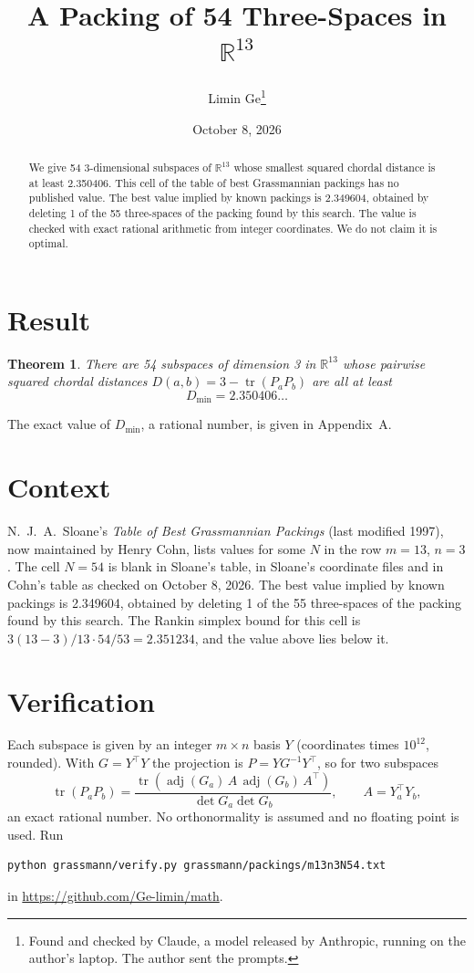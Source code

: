 \documentclass[11pt,a4paper]{article}
\title{A Packing of 54 Three-Spaces in $\mathbb{R}^{13}$}
\author{Limin Ge\thanks{Found and checked by Claude, a model released by Anthropic, running on the author's laptop. The author sent the prompts.}}
\date{October 8, 2026}
\newtheorem*{theorem}{Theorem}
\begin{document}
\maketitle
\begin{abstract}
We give 54 3-dimensional subspaces of $\mathbb{R}^{13}$ whose smallest squared chordal distance is at least 2.350406. This cell of the table of best Grassmannian packings has no published value. The best value implied by known packings is 2.349604, obtained by deleting 1 of the 55 three-spaces of the packing found by this search. The value is checked with exact rational arithmetic from integer coordinates. We do not claim it is optimal.
\end{abstract}

\section{Result}
\begin{theorem}
There are 54 subspaces of dimension 3 in $\mathbb{R}^{13}$ whose pairwise squared chordal distances $D(a,b) = 3 - \operatorname{tr}(P_aP_b)$ are all at least
\[ D_{\min} = 2.350406\ldots \]
\end{theorem}
The exact value of $D_{\min}$, a rational number, is given in Appendix~A.


\section{Context}
N.~J.~A.~Sloane's \emph{Table of Best Grassmannian Packings} (last modified 1997), now maintained by Henry Cohn, lists values for some $N$ in the row $m=13$, $n=3$. The cell $N=54$ is blank in Sloane's table, in Sloane's coordinate files and in Cohn's table as checked on October 8, 2026. The best value implied by known packings is 2.349604, obtained by deleting 1 of the 55 three-spaces of the packing found by this search. The Rankin simplex bound for this cell is $3(13-3)/13\cdot 54/53 = 2.351234$, and the value above lies below it.


\section{Verification}
Each subspace is given by an integer $m\times n$ basis $Y$ (coordinates times $10^{12}$, rounded). With $G=Y^\top Y$ the projection is $P=YG^{-1}Y^\top$, so for two subspaces
\[ \operatorname{tr}(P_aP_b)=\frac{\operatorname{tr}(\operatorname{adj}(G_a)\,A\,\operatorname{adj}(G_b)\,A^\top)}{\det G_a\det G_b},\qquad A=Y_a^\top Y_b, \]
an exact rational number. No orthonormality is assumed and no floating point is used. Run
\begin{verbatim}
python grassmann/verify.py grassmann/packings/m13n3N54.txt
\end{verbatim}
in \url{https://github.com/Ge-limin/math}.
\end{document}
